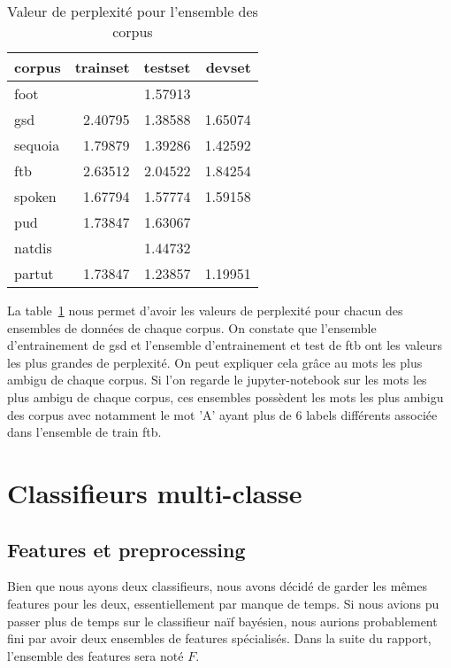 \documentclass[french, 14pt]{memoir}
\begin{document}
\begin{table}
\begin{center}
\begin{tabular}{|l|r|r|r|}
\hline
corpus & trainset & testset & devset \\
\hline
 foot    &         & 1.57913 &         \\
 gsd     & 2.40795 & 1.38588 & 1.65074 \\
 sequoia & 1.79879 & 1.39286 & 1.42592 \\
 ftb     & 2.63512 & 2.04522 & 1.84254 \\
 spoken  & 1.67794 & 1.57774 & 1.59158 \\
 pud     & 1.73847 & 1.63067 &         \\
 natdis  &         & 1.44732 &         \\
 partut  & 1.73847 & 1.23857 & 1.19951 \\
\hline
\end{tabular}
\end{center}
\caption{Valeur de perplexité pour l'ensemble des corpus}
\label{perplexityTable}
\end{table}

La table~\ref{perplexityTable} nous permet d'avoir les valeurs de perplexité pour chacun des ensembles de données de chaque corpus. On constate que l'ensemble d'entrainement de gsd et l'ensemble d'entrainement et test de ftb ont les valeurs les plus grandes de perplexité. On peut expliquer cela grâce au mots les plus ambigu de chaque corpus. Si l'on regarde le jupyter-notebook sur les mots les plus ambigu de chaque corpus, ces ensembles possèdent les mots les plus ambigu des corpus avec notamment le mot 'A' ayant plus de 6 labels différents associée dans l'ensemble de train ftb.

\chapter{Classifieurs multi-classe}

\section{Features et preprocessing}

Bien que nous ayons deux classifieurs, nous avons décidé de garder les mêmes features pour les deux, essentiellement par manque de temps. Si nous avions pu passer plus de temps sur le classifieur naïf bayésien, nous aurions probablement fini par avoir deux ensembles de features spécialisés. Dans la suite du rapport, l'ensemble des features sera noté $F$.
\end{document}
